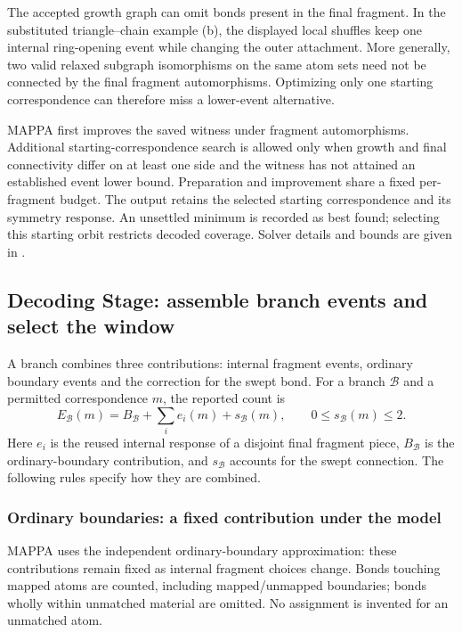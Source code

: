 The accepted growth graph can omit bonds present in the final fragment. In the substituted triangle--chain example (b), the displayed local shuffles keep one internal ring-opening event while changing the outer attachment. More generally, two valid relaxed subgraph isomorphisms on the same atom sets need not be connected by the final fragment automorphisms. Optimizing only one starting correspondence can therefore miss a lower-event alternative.

MAPPA first improves the saved witness under fragment automorphisms. Additional starting-correspondence search is allowed only when growth and final connectivity differ on at least one side and the witness has not attained an established event lower bound. Preparation and improvement share a fixed per-fragment budget. The output retains the selected starting correspondence and its symmetry response. An unsettled minimum is recorded as best found; selecting this starting orbit restricts decoded coverage. Solver details and bounds are given in .

\subsection{Decoding Stage: assemble branch events and select the window}
\label{sec:window}

A branch combines three contributions: internal fragment events, ordinary boundary events and the correction for the swept bond. For a branch $\mathcal B$ and a permitted correspondence $m$, the reported count is
\begin{equation}
 E_{\mathcal B}(m)=B_{\mathcal B}+\sum_i e_i(m)+s_{\mathcal B}(m),
 \qquad 0\leq s_{\mathcal B}(m)\leq 2.
 \label{eq:composition}
\end{equation}
Here $e_i$ is the reused internal response of a disjoint final fragment piece, $B_{\mathcal B}$ is the ordinary-boundary contribution, and $s_{\mathcal B}$ accounts for the swept connection. The following rules specify how they are combined.

\subsubsection{Ordinary boundaries: a fixed contribution under the model}

MAPPA uses the independent ordinary-boundary approximation: these contributions remain fixed as internal fragment choices change. Bonds touching mapped atoms are counted, including mapped/unmapped boundaries; bonds wholly within unmatched material are omitted. No assignment is invented for an unmatched atom.

